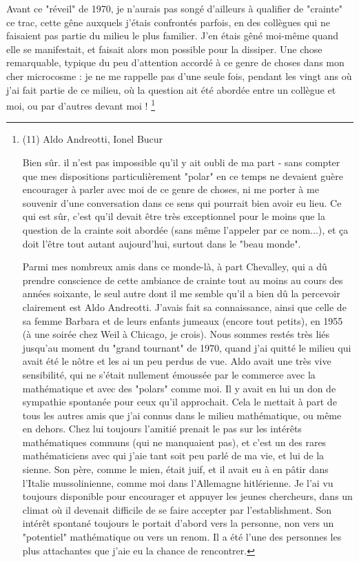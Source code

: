 Avant ce "réveil" de 1970, je n'aurais pas songé d'ailleurs à qualifier de "crainte" ce trac, cette gêne auxquels j'étais confrontés parfois, en des collègues qui ne faisaient pas partie du milieu le plus familier. J'en étais gêné moi-même quand elle se manifestait, et faisait alors mon possible pour la dissiper. Une chose remarquable, typique du peu d'attention accordé à ce genre de choses dans mon cher microcosme : je ne me rappelle pas d'une seule fois, pendant les vingt ans où j'ai fait partie de ce milieu, où la question ait été abordée entre un collègue et moi, ou par d'autres devant moi ! \footnote{(11) Aldo Andreotti, Ionel Bucur \par Bien sûr. il n'est pas impossible qu'il y ait oubli de ma part - sans compter que mes dispositions particulièrement "polar" en ce temps ne devaient guère encourager à parler avec moi de ce genre de choses, ni me porter à me souvenir d'une conversation dans ce sens qui pourrait bien avoir eu lieu. Ce qui est sûr, c'est qu'il devait être très exceptionnel pour le moins que la question de la crainte soit abordée (sans même l'appeler par ce nom...), et ça doit l'être tout autant aujourd'hui, surtout dans le "beau monde".

Parmi mes nombreux amis dans ce monde-là, à part Chevalley, qui a dû prendre conscience de cette ambiance de crainte tout au moins au cours des années soixante, le seul autre dont il me semble qu'il a bien dû la percevoir clairement est Aldo Andreotti. J'avais fait sa connaissance, ainsi que celle de sa femme Barbara et de leurs enfants jumeaux (encore tout petits), en 1955 (à une soirée chez Weil à Chicago, je crois). Nous sommes restés très liés jusqu'au moment du "grand tournant" de 1970, quand j'ai quitté le milieu qui avait été le nôtre et les ai un peu perdus de vue. Aldo avait une très vive sensibilité, qui ne s'était nullement émoussée par le commerce avec la mathématique et avec des "polars" comme moi. Il y avait en lui un don de sympathie spontanée pour ceux qu'il approchait. Cela le mettait à part de tous les autres amis que j'ai connus dans le milieu mathématique, ou même en dehors. Chez lui toujours l'amitié prenait le pas sur les intérêts mathématiques communs (qui ne manquaient pas), et c'est un des rares mathématiciens avec qui j'aie tant soit peu parlé de ma vie, et lui de la sienne. Son père, comme le mien, était juif, et il avait eu à en pâtir dans l'Italie mussolinienne, comme moi dans l'Allemagne hitlérienne. Je l'ai vu toujours disponible pour encourager et appuyer les jeunes chercheurs, dans un climat où il devenait difficile de se faire accepter par l'establishment. Son intérêt spontané toujours le portait d'abord vers la personne, non vers un "potentiel" mathématique ou vers un renom. Il a été l'une des personnes les plus attachantes que j'aie eu la chance de rencontrer.

}
